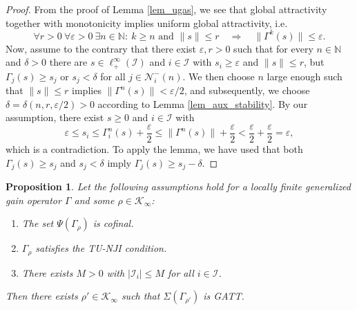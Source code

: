 \documentclass[10pt, oneside, a4paper]{article}
\newcommand{\N}{\mathbb{N}}
\newcommand{\ep}{\varepsilon}
\newcommand{\IC}{\mathcal{I}}
\newcommand{\KC}{\mathcal{K}}
\newcommand{\NC}{\mathcal{N}}
\newtheorem{proposition}{Proposition}[section]
\begin{document}
\begin{proof}
From the proof of Lemma \ref{lem_ugas}, we see that global attractivity together with monotonicity implies uniform global attractivity, i.e.%
\begin{equation*}
  \forall r > 0\ \forall \ep > 0\ \exists n \in \N:\ k \geq n \mbox{ and } \|s\| \leq r \quad \Rightarrow \quad \|\Gamma^k(s)\| \leq \ep.%
\end{equation*}
Now, assume to the contrary that there exist $\ep,r > 0$ such that for every $n \in \N$ and $\delta > 0$ there are $s \in \ell^{\infty}_+(\IC)$ and $i \in \IC$ with $s_i \geq \ep$ and $\|s\| \leq r$, but $\Gamma_j(s) \geq s_j$ or $s_j < \delta$ for all $j \in \NC^-_i(n)$. We then choose $n$ large enough such that $\|s\| \leq r$ implies $\|\Gamma^n(s)\| < \ep/2$, and subsequently, we choose $\delta = \delta(n,r,\ep/2) > 0$ according to Lemma \ref{lem_aux_stability}. By our assumption, there exist $s \geq 0$ and $i \in \IC$ with%
\begin{equation*}
  \ep \leq s_i \leq \Gamma^n_i(s) + \frac{\ep}{2} \leq \|\Gamma^n(s)\| + \frac{\ep}{2} < \frac{\ep}{2} + \frac{\ep}{2} = \ep,%
\end{equation*}
which is a contradiction. To apply the lemma, we have used that both $\Gamma_j(s) \geq s_j$ and $s_j < \delta$ imply $\Gamma_j(s) \geq s_j - \delta$.
\end{proof}

\begin{proposition}\label{prop_uniform_NJI_implies_GATT}
Let the following assumptions hold for a locally finite generalized gain operator $\Gamma$ and some $\rho \in \KC_{\infty}$:%
\begin{enumerate}
\item[(i)] The set $\Psi(\Gamma_{\rho})$ is cofinal.%
\item[(ii)] $\Gamma_{\rho}$ satisfies the TU-NJI condition.%
\item[(iii)] There exists $M > 0$ with $|\IC_i| \leq M$ for all $i \in \IC$.%
\end{enumerate}
Then there exists $\rho' \in \KC_{\infty}$ such that $\Sigma(\Gamma_{\rho'})$ is GATT. 
\end{proposition}
\end{document}
